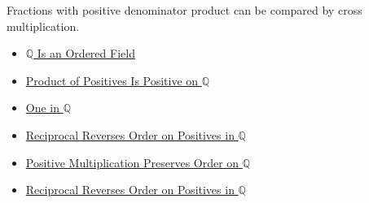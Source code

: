 \begin{remark*}[Interpretation]
Fractions with positive denominator product can be compared by cross multiplication.
\end{remark*}

\begin{dependencies}
\begin{itemize}
  \item \hyperref[thm:q-is-an-ordered-field]{$\mathbb{Q}$ Is an Ordered Field}
  \item \hyperref[prop:product-of-positives-is-positive-q]{Product of Positives Is Positive on $\mathbb{Q}$}
  \item \hyperref[def:one-in-q]{One in $\mathbb{Q}$}
  \item \hyperref[thm:reciprocal-reverses-order-on-positives-q]{Reciprocal Reverses Order on Positives in $\mathbb{Q}$}
  \item \hyperref[thm:positive-multiplication-preserves-order-on-q]{Positive Multiplication Preserves Order on $\mathbb{Q}$}
  \item \hyperref[thm:reciprocal-reverses-order-on-positives-q]{Reciprocal Reverses Order on Positives in $\mathbb{Q}$}
\end{itemize}
\end{dependencies}
